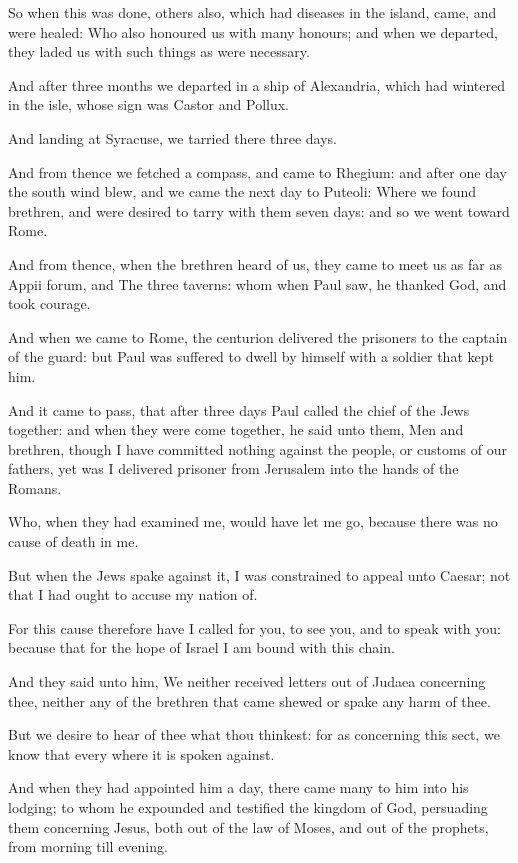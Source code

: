 \verse So when this was done, others also, which had diseases in the island, came, and were healed: \verse Who also honoured us with many honours; and when we departed, they laded us with such things as were necessary.

\verse And after three months we departed in a ship of Alexandria, which had wintered in the isle, whose sign was Castor and Pollux.

\verse And landing at Syracuse, we tarried there three days.

\verse And from thence we fetched a compass, and came to Rhegium: and after one day the south wind blew, and we came the next day to Puteoli: \verse Where we found brethren, and were desired to tarry with them seven days: and so we went toward Rome.

\verse And from thence, when the brethren heard of us, they came to meet us as far as Appii forum, and The three taverns: whom when Paul saw, he thanked God, and took courage.

\verse And when we came to Rome, the centurion delivered the prisoners to the captain of the guard: but Paul was suffered to dwell by himself with a soldier that kept him.

\verse And it came to pass, that after three days Paul called the chief of the Jews together: and when they were come together, he said unto them, Men and brethren, though I have committed nothing against the people, or customs of our fathers, yet was I delivered prisoner from Jerusalem into the hands of the Romans.

\verse Who, when they had examined me, would have let me go, because there was no cause of death in me.

\verse But when the Jews spake against it, I was constrained to appeal unto Caesar; not that I had ought to accuse my nation of.

\verse For this cause therefore have I called for you, to see you, and to speak with you: because that for the hope of Israel I am bound with this chain.

\verse And they said unto him, We neither received letters out of Judaea concerning thee, neither any of the brethren that came shewed or spake any harm of thee.

\verse But we desire to hear of thee what thou thinkest: for as concerning this sect, we know that every where it is spoken against.

\verse And when they had appointed him a day, there came many to him into his lodging; to whom he expounded and testified the kingdom of God, persuading them concerning Jesus, both out of the law of Moses, and out of the prophets, from morning till evening.

